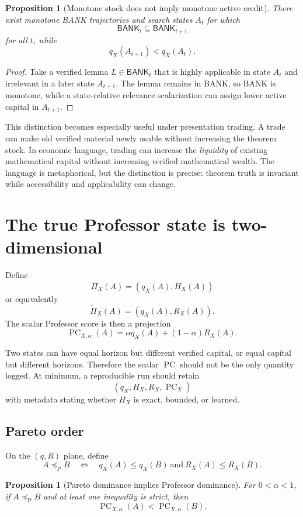 \documentclass[11pt]{article}
\newtheorem{proposition}[theorem]{Proposition}
\theoremstyle{definition}
\theoremstyle{remark}
\newcommand{\PC}{\operatorname{PC}}
\newcommand{\BANK}{\mathsf{BANK}}
\begin{document}
\begin{proposition}[Monotone stock does not imply monotone active credit]
There exist monotone BANK trajectories and search states $A_t$ for which
\[
\BANK_t\subseteq\BANK_{t+1}
\]
for all $t$, while
\[
q_X(A_{t+1})<q_X(A_t).
\]
\end{proposition}

\begin{proof}
Take a verified lemma $L\in\BANK_t$ that is highly applicable in state $A_t$ and irrelevant in a later state $A_{t+1}$. The lemma remains in BANK, so BANK is monotone, while a state-relative relevance scalarization can assign lower active capital in $A_{t+1}$.
\end{proof}

This distinction becomes especially useful under presentation trading. A trade can make old verified material newly usable without increasing the theorem stock. In economic language, trading can increase the \emph{liquidity} of existing mathematical capital without increasing verified mathematical wealth. The language is metaphorical, but the distinction is precise: theorem truth is invariant while accessibility and applicability can change.

\section{The true Professor state is two-dimensional}

Define
\[
\boxed{\Pi_X(A)=(q_X(A),H_X(A))}
\]
or equivalently
\[
\boxed{\widetilde\Pi_X(A)=(q_X(A),R_X(A)).}
\]
The scalar Professor score is then a projection
\[
\PC_{X,\alpha}(A)=\alpha q_X(A)+(1-\alpha)R_X(A).
\]

Two states can have equal horizon but different verified capital, or equal capital but different horizons. Therefore the scalar $\PC$ should not be the only quantity logged. At minimum, a reproducible run should retain
\[
(q_X,H_X,R_X,\PC_X)
\]
with metadata stating whether $H_X$ is exact, bounded, or learned.

\subsection{Pareto order}

On the $(q,R)$ plane, define
\[
A\preceq_{\mathrm P}B
\quad\Longleftrightarrow\quad
q_X(A)\le q_X(B)\ \text{and}\ R_X(A)\le R_X(B).
\]

\begin{proposition}[Pareto dominance implies Professor dominance]
For $0<\alpha<1$, if $A\preceq_{\mathrm P}B$ and at least one inequality is strict, then
\[
\PC_{X,\alpha}(A)<\PC_{X,\alpha}(B).
\]
\end{proposition}
\end{document}
